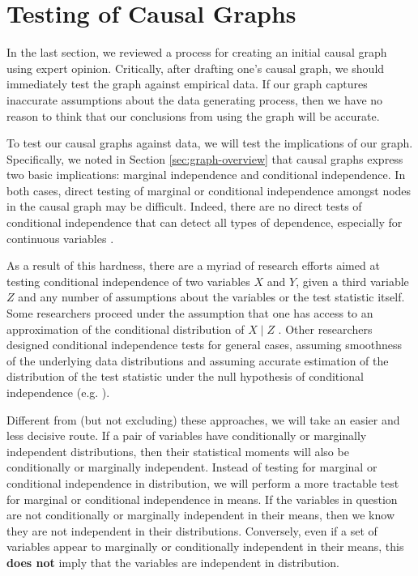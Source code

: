 \section{Testing of Causal Graphs}

In the last section, we reviewed a process for creating an initial causal graph using expert opinion.
Critically, after drafting one's causal graph, we should immediately test the graph against empirical data.
If our graph captures inaccurate assumptions about the data generating process, then we have no reason to think that our conclusions from using the graph will be accurate.

To test our causal graphs against data, we will test the implications of our graph.
Specifically, we noted in Section \ref{sec:graph-overview} that causal graphs express two basic implications: marginal independence and conditional independence.
In both cases, direct testing of marginal or conditional independence amongst nodes in the causal graph may be difficult.
Indeed, there are no direct tests of conditional independence that can detect all types of dependence, especially for continuous variables \citep{bergsma_2004_testing, shah_2020_hardness}.

As a result of this hardness, there are a myriad of research efforts aimed at testing conditional independence of two variables $X$ and $Y$, given a third variable $Z$ and any number of assumptions about the variables or the test statistic itself.
Some researchers proceed under the assumption that one has access to an approximation of the conditional distribution of $X \mid Z$ \citep{candes_2018_panning, berrett_2019_conditional}.
Other researchers designed conditional independence tests for general cases, assuming smoothness of the underlying data distributions and assuming accurate estimation of the distribution of the test statistic under the null hypothesis of conditional independence (e.g. \citet{zhang_2012_kernel, strobl_2019_approximate}).

Different from (but not excluding) these approaches, we will take an easier and less decisive route.
If a pair of variables have conditionally or marginally independent distributions, then their statistical moments will also be conditionally or marginally independent.
Instead of testing for marginal or conditional independence in distribution, we will perform a more tractable test for marginal or conditional independence in means.
If the variables in question are not conditionally or marginally independent in their means, then we know they are not independent in their distributions.
Conversely, even if a set of variables appear to marginally or conditionally independent in their means, this \textbf{does not} imply that the variables are independent in distribution.

